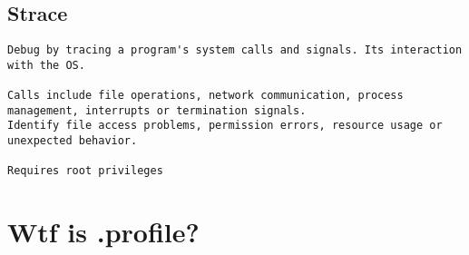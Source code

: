 \subsection{Strace}
\begin{verbatim}
Debug by tracing a program's system calls and signals. Its interaction with the OS.

Calls include file operations, network communication, process management, interrupts or termination signals.
Identify file access problems, permission errors, resource usage or unexpected behavior. 

Requires root privileges
\end{verbatim}

\section{Wtf is .profile?}

\begin{verbatim}

\end{verbatim}

